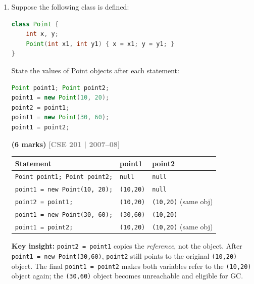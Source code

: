 \documentclass[12pt,a3paper]{article}
\newcommand{\yr}[1]{\hfill\textcolor{gray}{\small\textbf{[#1]}}}
\newcommand{\mk}[1]{\textcolor{orange!70!black}{\small\textbf{(#1 marks)}}}
\begin{document}
\begin{enumerate}
\begin{tcolorbox}[enhanced,breakable,ansbox,
  colback=cC!4,colframe=cC,boxrule=0.8pt,arc=5pt,
  title={\textbf{Answer --- Overriding \texttt{equals()} in Student}},
  fonttitle=\bfseries\color{white},colbacktitle=cC]
\begin{lstlisting}[language=Java]
        System.out.println(s1.equals(s2)); // false
        System.out.println(s1.equals(s3)); // true
        System.out.println(s1.equals(s4)); // false
    }
}
\end{lstlisting}
\textbf{Note:} \texttt{Double.compare()} is used instead of \texttt{==}
for \texttt{double} comparison to avoid floating-point precision issues.
\end{tcolorbox}

\item Suppose the following class is defined:
\begin{lstlisting}[language=Java]
class Point {
    int x, y;
    Point(int x1, int y1) { x = x1; y = y1; }
}
\end{lstlisting}
State the values of Point objects after each statement:
\begin{lstlisting}[language=Java]
Point point1; Point point2;
point1 = new Point(10, 20);
point2 = point1;
point1 = new Point(30, 60);
point1 = point2;
\end{lstlisting}
\mk{6}
\yr{CSE 201 | 2007--08}

\begin{tcolorbox}[enhanced,breakable,ansbox,
  colback=cC!4,colframe=cC,boxrule=0.8pt,arc=5pt,
  title={\textbf{Answer --- Point Object Reference Tracing}},
  fonttitle=\bfseries\color{white},colbacktitle=cC]

\begin{center}
\small
\begin{tabular}{@{}lll@{}}
\toprule
\textbf{Statement} & \textbf{point1} & \textbf{point2} \\
\midrule
\texttt{Point point1; Point point2;} & \texttt{null} & \texttt{null} \\
\texttt{point1 = new Point(10, 20);} & \texttt{(10,20)} & \texttt{null} \\
\texttt{point2 = point1;}            & \texttt{(10,20)} & \texttt{(10,20)} (same obj) \\
\texttt{point1 = new Point(30, 60);} & \texttt{(30,60)} & \texttt{(10,20)} \\
\texttt{point1 = point2;}            & \texttt{(10,20)} & \texttt{(10,20)} (same obj) \\
\bottomrule
\end{tabular}
\end{center}

\medskip
\textbf{Key insight:} \texttt{point2 = point1} copies the
\emph{reference}, not the object. After \texttt{point1 = new
Point(30,60)}, \texttt{point2} still points to the original
\texttt{(10,20)} object. The final \texttt{point1 = point2} makes both
variables refer to the \texttt{(10,20)} object again; the
\texttt{(30,60)} object becomes unreachable and eligible for GC.
\end{tcolorbox}


\end{enumerate}
\end{document}
